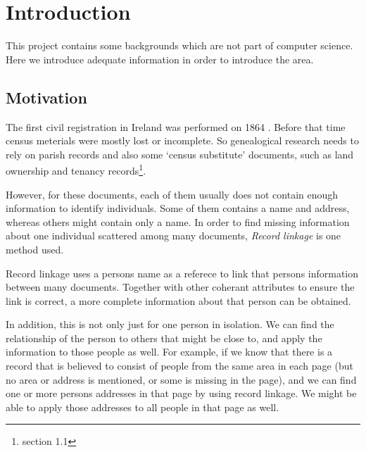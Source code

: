\chapter{Introduction}
\label{ch:introduction}

This project contains some backgrounds which are not part of computer science.
Here we introduce adequate information in order to introduce the area.

\section{Motivation}

The first civil registration in Ireland was performed on 1864 \cite[]{irishregistration}.
Before that time census meterials were mostly lost or incomplete. So genealogical research
needs to rely on parish records and also some `census substitute' documents,
such as land ownership and tenancy records\footnote{\cite[]{adamw} section 1.1}.

However, for these documents, each of them usually does not contain enough
information to identify individuals. Some of them contains a name and address,
whereas others might contain only a name. In order to find missing information
about one individual scattered among many documents, \emph{Record linkage}
is one method used.


Record linkage uses a person\textquotesingle s name as a referece to link that
person\textquotesingle s information between many documents.
Together with other coherant attributes to ensure the link is correct, a
more complete information about that person can be obtained.

In addition, this is not only just for one person in isolation. We can find the relationship
of the person to others that might be close to, and apply the information
to those people as well. For example, if we know that there is a record
that is believed to consist of people from the same area in each page \cite[]{morpeth}
(but no area or address is mentioned, or some is missing in the page), and we can find
one or more person\textquotesingle s addresses in that page by using record linkage.
We might be able to apply those addresses to all people in that page as well.


